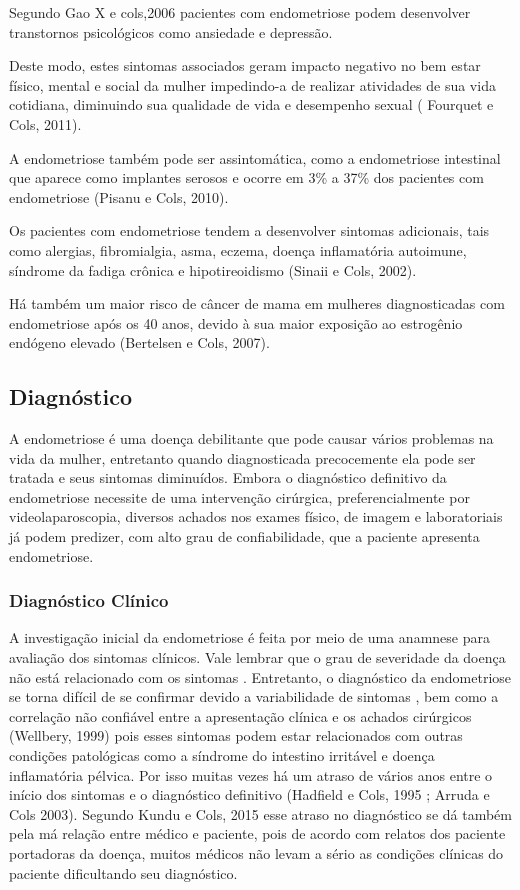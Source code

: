 \documentclass[12pt]{article} %
\begin{document}
Segundo Gao X e cols,2006  pacientes com endometriose podem desenvolver transtornos psicológicos como ansiedade e depressão.


Deste modo, estes sintomas associados geram impacto negativo no bem estar físico, mental e social da mulher impedindo-a de realizar atividades de sua vida cotidiana, diminuindo sua qualidade de vida e desempenho sexual ( Fourquet e Cols, 2011).


A endometriose também pode ser assintomática, como a endometriose intestinal que aparece como implantes serosos e ocorre em 3\% a 37\% dos pacientes com endometriose (Pisanu e Cols, 2010).


Os pacientes com endometriose tendem a desenvolver sintomas adicionais, tais como alergias, fibromialgia, asma, eczema, doença inflamatória autoimune, síndrome da fadiga crônica e hipotireoidismo (Sinaii e Cols, 2002).

Há também um maior risco de câncer de mama em mulheres diagnosticadas com endometriose após os 40 anos, devido à sua maior exposição ao estrogênio endógeno elevado (Bertelsen e Cols, 2007). 


\subsection{Diagnóstico}

A endometriose é uma doença debilitante que pode causar vários problemas na vida da mulher, entretanto quando diagnosticada precocemente ela pode ser tratada e seus sintomas diminuídos.
Embora o diagnóstico definitivo da endometriose necessite de uma intervenção cirúrgica, preferencialmente por videolaparoscopia, diversos achados nos exames físico, de imagem e laboratoriais já podem predizer, com alto grau de confiabilidade, que a paciente apresenta endometriose.



\subsubsection{Diagnóstico Clínico}

A investigação inicial da endometriose é feita por meio de uma anamnese para avaliação dos sintomas clínicos. Vale lembrar que o grau de severidade da doença não está relacionado com os sintomas . Entretanto, o diagnóstico da endometriose se torna difícil de se confirmar devido a variabilidade de sintomas , bem como a correlação não confiável entre a apresentação clínica e os achados cirúrgicos (Wellbery, 1999) pois esses sintomas podem estar relacionados com outras condições patológicas como a síndrome do intestino irritável e doença inflamatória pélvica. Por isso muitas vezes há um atraso de vários anos entre o início dos sintomas e o diagnóstico definitivo (Hadfield e Cols, 1995 ; Arruda e Cols 2003). Segundo Kundu e Cols, 2015 esse atraso no diagnóstico se dá também pela má relação entre médico e paciente, pois de acordo com relatos dos paciente portadoras da doença, muitos médicos não levam a sério as condições clínicas do paciente dificultando seu diagnóstico.
\end{document}

